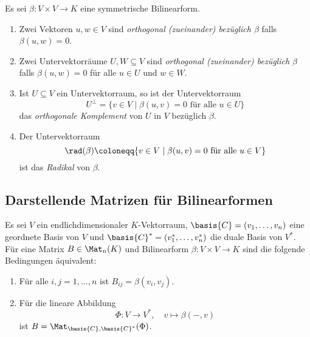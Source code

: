 \begin{definition}
  Es sei $\beta \colon V \times V \to K$ eine symmetrische Bilinearform.
  \begin{enumerate}[leftmargin=*, label=\roman*)]
    \item
      Zwei Vektoren $u, w \in V$ sind \emph{orthogonal (zueinander) bezüglich $\beta$} falls $\beta(u,w) = 0$.
    \item
      Zwei Untervektorräume $U, W \subseteq V$ sind \emph{orthogonal (zueinander) bezüglich $\beta$} falls $\beta(u,w) = 0$ für alle $u \in U$ und $w \in W$.
    \item
      Ist $U \subseteq V$ ein Untervektorraum, so ist der Untervektorraum
      \[
        U^\perp
        =
        \{
          v \in V
          \mid
          \text{$\beta(u,v) = 0$ für alle $u \in U$}
        \}
      \]
      das \emph{orthogonale Komplement} von $U$ in $V$ bezüglich $\beta$.
    \item
      Der Untervektorraum
      \[
        \rad(\beta)
        \coloneqq
        \{v \in V \mid \text{$\beta(u,v) = 0$ für alle $u \in V$}\}
      \]
      ist das \emph{Radikal} von $\beta$.
  \end{enumerate}
\end{definition}












\subsection{Darstellende Matrizen für Bilinearformen}


\begin{lemma}
  Es sei $V$ ein endlichdimensionaler $K$-Vektorraum, $\basis{C} = (v_1, \dotsc, v_n)$ eine geordnete Basis von $V$ und $\basis{C}^* = (v_1^*, \dotsc, v_n^*)$ die duale Basis von $V^*$.
  Für eine Matrix $B \in \Mat_n(K)$ und Bilinearform $\beta \colon V \times V \to K$ sind die folgende Bedingungen äquivalent:
  \begin{enumerate}[leftmargin=*, label=\roman*)]
    \item
      Für alle $i,j = 1, \dotsc, n$ ist $B_{ij} = \beta(v_i, v_j)$.
    \item
      Für die lineare Abbildung
      \[
        \Phi \colon V \to V^*,
        \quad
        v \mapsto \beta(-,v)
      \]
      ist $B = \Mat_{\basis{C}, \basis{C}^*}(\Phi)$.
  \end{enumerate}
\end{lemma}


